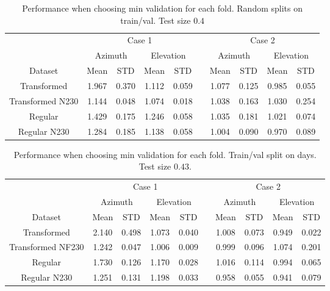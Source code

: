 \begin{table}[!htbp]
    \centering
    \caption{Performance when choosing min validation for each fold. Random splits on train/val. Test size $0.4$}
    \begin{tabular}{ccccc c cccc}
        \toprule
        \multicolumn{1}{c}{} & \multicolumn{4}{c}{Case 1} & & \multicolumn{4}{c}{Case 2} \\
        \cmidrule(lr){2-5} \cmidrule(lr){7-10}
        \multicolumn{1}{c}{} & \multicolumn{2}{c}{Azimuth} & \multicolumn{2}{c}{Elevation} & & \multicolumn{2}{c}{Azimuth} & \multicolumn{2}{c}{Elevation} \\ 
        \cmidrule(lr){2-5} \cmidrule(lr){7-10}
        Dataset &  Mean &  STD &  Mean &  STD & & Mean &  STD &  Mean &  STD \\
        \midrule
        Transformed      &     1.967 &   0.370 &     1.112 &     0.059 &   &  1.077 &     0.125 &     0.985 &     0.055 \\
        Transformed N230 &     1.144 &   0.048 &     1.074 &     0.018 &   &  1.038 &     0.163 &     1.030 &     0.254 \\
        Regular          &     1.429 &   0.175 &     1.246 &     0.058 &   &  1.035 &     0.181 &     1.021 &     0.074 \\
        Regular N230     &     1.284 &   0.185 &     1.138 &     0.058 &   &  1.004 &     0.090 &     0.970 &     0.089 \\
        \bottomrule
    \end{tabular}
\end{table}
    
\begin{table}[!htbp]
    \centering
    \caption{Performance when choosing min validation for each fold. Train/val split on days. Test size $0.43$.}
    \begin{tabular}{ccccc c cccc}
        \toprule
        \multicolumn{1}{c}{} & \multicolumn{4}{c}{Case 1} & & \multicolumn{4}{c}{Case 2} \\
        \cmidrule(lr){2-5} \cmidrule(lr){7-10}
        \multicolumn{1}{c}{} & \multicolumn{2}{c}{Azimuth} & \multicolumn{2}{c}{Elevation} & & \multicolumn{2}{c}{Azimuth} & \multicolumn{2}{c}{Elevation} \\ 
        \cmidrule(lr){2-5} \cmidrule(lr){7-10}
        Dataset &  Mean &  STD &  Mean &  STD & & Mean &  STD &  Mean &  STD \\
        \midrule
        Transformed       &     2.140 &     0.498 &     1.073 &     0.040 &  &   1.008 &     0.073 &     0.949 &     0.022 \\
        Transformed NF230 &     1.242 &     0.047 &     1.006 &     0.009 &  &   0.999 &     0.096 &     1.074 &     0.201 \\
        Regular           &     1.730 &     0.126 &     1.170 &     0.028 &  &   1.016 &     0.114 &     0.994 &     0.065 \\
        Regular N230      &     1.251 &     0.131 &     1.198 &     0.033 &  &   0.958 &     0.055 &     0.941 &     0.079 \\
        \bottomrule
    \end{tabular}
\end{table}
    


